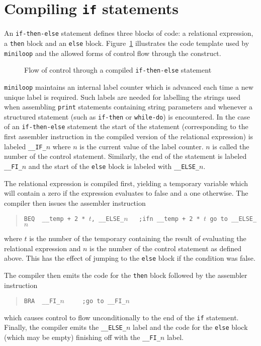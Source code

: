 \section{Compiling {\tt if} statements}
An {\tt if-then-else} statement defines three blocks of code: a relational expression,
a {\tt then} block and an {\tt else} block. Figure~\ref{if:statement} illustrates the
code template used by {\tt miniloop} and the allowed forms of
control flow through the construct.
\begin{figure}
\begin{center}

\end{center}
\caption{Flow of control through a compiled {\tt if-then-else} statement}
\label{if:statement}
\end{figure}
{\tt miniloop} maintains an internal label counter which is advanced
each time a new unique label is required. Such labels are needed for
labelling the strings used when assembling {\tt print} statements
containing string parameters and whenever a structured statement (such
as {\tt if-then} or {\tt while-do}) is encountered.  In the case of an
{\tt if-then-else} statement the start of the statement (corresponding
to the first assembler instruction in the compiled version of the
relational expression) is labeled \verb+__IF_+$n$ where $n$ is the
current value of the label counter. $n$ is called the number of the control statement. 
Similarly, the end of the statement is
labeled \verb+__FI_+$n$ and the start of the {\tt else} block is labeled
with \verb+__ELSE_+$n$. 

The relational expression is compiled first, yielding a temporary variable which will contain
a zero if the expression evaluates to {\sc false} and a one otherwise. The compiler then
issues the assembler instruction
\begin{quote}
\verb|BEQ  __temp + 2 * |$t$\verb|, __ELSE_|$n$\verb|   ;ifn __temp + 2 * |$t$\verb| go to __ELSE_|$n$
\end{quote}
where $t$ is the number of the temporary containing the result of
evaluating the relational expression and $n$ is the number of the
control statement as defined above. This has the effect of jumping to the {\tt else}
block if the condition was false. 

The compiler then emits the code for the {\tt then} block followed by the assembler instruction
\begin{quote}
\verb|BRA  __FI_|$n$\verb|     ;go to __FI_|$n$
\end{quote}
which causes control to flow unconditionally to the end of the {\tt if}
statement. Finally, the compiler emits the \verb|__ELSE_|$n$ label and the
code for the {\tt else} block (which may be empty) finishing off with the \verb+__FI_+$n$
label.

